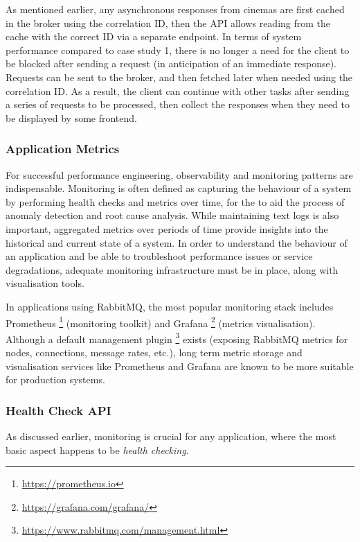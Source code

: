As mentioned earlier, any asynchronous responses from cinemas are first cached in the broker using the correlation ID, then the API allows reading from the cache with the correct ID via a separate endpoint. In terms of system performance compared to case study 1, there is no longer a need for the client to be blocked after sending a request (in anticipation of an immediate response). Requests can be sent to the broker, and then fetched later when needed using the correlation ID. As a result, the client can continue with other tasks after sending a series of requests to be processed, then collect the responses when they need to be displayed by some frontend.


\subsubsection{Application Metrics}

For successful performance engineering, observability and monitoring patterns are indispensable. Monitoring is often defined as capturing the behaviour of a system by performing health checks and metrics over time, for the to aid the process of anomaly detection and root cause analysis. While maintaining text logs is also important, aggregated metrics over periods of time provide insights into the historical and current state of a system. In order to understand the behaviour of an application and be able to troubleshoot performance issues or service degradations, adequate monitoring infrastructure must be in place, along with visualisation tools.

In applications using RabbitMQ, the most popular monitoring stack includes Prometheus \footnote{\url{https://prometheus.io}} (monitoring toolkit) and Grafana \footnote{\url{https://grafana.com/grafana/}} (metrics visualisation). Although a default management plugin \footnote{\url{https://www.rabbitmq.com/management.html}} exists (exposing RabbitMQ metrics for nodes, connections, message rates, etc.), long term metric storage and visualisation
services like Prometheus and Grafana are known to be more suitable for production systems.



\subsubsection{Health Check API}

As discussed earlier, monitoring is crucial for any application, where the most basic aspect happens to be \textit{health checking}.


